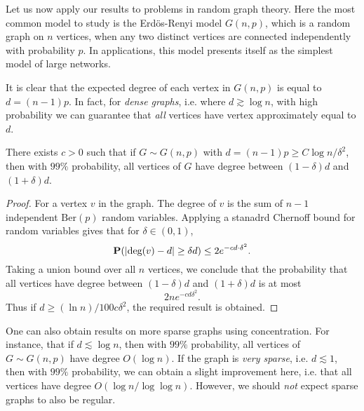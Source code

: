 Let us now apply our results to problems in random graph theory. Here the most common model to study is the Erd\"{o}s-Renyi model $G(n,p)$, which is a random graph on $n$ vertices, when any two distinct vertices are connected independently with probability $p$. In applications, this model presents itself as the simplest model of large networks.

It is clear that the expected degree of each vertex in $G(n,p)$ is equal to $d = (n - 1)p$. In fact, for \emph{dense graphs}, i.e. where $d \gtrsim \log n$, with high probability we can guarantee that \emph{all} vertices have vertex approximately equal to $d$.

\begin{theorem}
    There exists $c > 0$ such that if $G \sim G(n,p)$ with $d = (n-1)p \geq C \log n / \delta^2$, then with $99\%$ probability, all vertices of $G$ have degree between $(1 - \delta) d$ and $(1 + \delta) d$.
\end{theorem}
\begin{proof}
    For a vertex $v$ in the graph. The degree of $v$ is the sum of $n-1$ independent $\text{Ber}(p)$ random variables. Applying a stanadrd Chernoff bound for random variables gives that for $\delta \in (0,1)$,
    \[ \operatorname{\mathbf{P}}( | \text{deg}(v) - d | \geq \delta d ) \leq 2 e^{- c d \cdot \delta^2}. \]
    Taking a union bound over all $n$ vertices, we conclude that the probability that all vertices have degree between $(1 - \delta) d$ and $(1 + \delta) d$ is at most
    \[ 2 n e^{-c d \delta^2}. \]
    Thus if $d \geq (\ln n) / 100 c \delta^2$, the required result is obtained.
\end{proof}

One can also obtain results on more sparse graphs using concentration. For instance, that if $d \lesssim \log n$, then with $99\%$ probability, all vertices of $G \sim G(n,p)$ have degree $O(\log n)$. If the graph is \emph{very sparse}, i.e. $d \lesssim 1$, then with $99\%$ probability, we can obtain a slight improvement here, i.e. that all vertices have degree $O(\log n / \log \log n)$. However, we should \emph{not} expect sparse graphs to also be regular.

